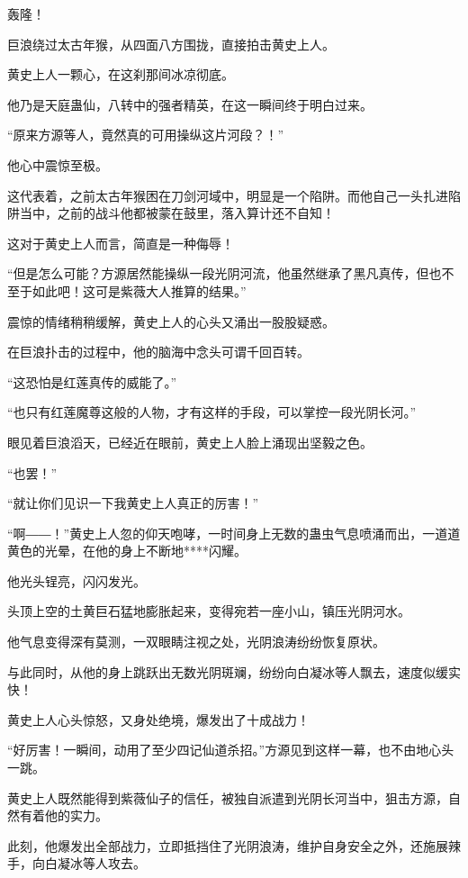 
\begin{this_body}

轰隆！

巨浪绕过太古年猴，从四面八方围拢，直接拍击黄史上人。

黄史上人一颗心，在这刹那间冰凉彻底。

他乃是天庭蛊仙，八转中的强者精英，在这一瞬间终于明白过来。

“原来方源等人，竟然真的可用操纵这片河段？！”

他心中震惊至极。

这代表着，之前太古年猴困在刀剑河域中，明显是一个陷阱。而他自己一头扎进陷阱当中，之前的战斗他都被蒙在鼓里，落入算计还不自知！

这对于黄史上人而言，简直是一种侮辱！

“但是怎么可能？方源居然能操纵一段光阴河流，他虽然继承了黑凡真传，但也不至于如此吧！这可是紫薇大人推算的结果。”

震惊的情绪稍稍缓解，黄史上人的心头又涌出一股股疑惑。

在巨浪扑击的过程中，他的脑海中念头可谓千回百转。

“这恐怕是红莲真传的威能了。”

“也只有红莲魔尊这般的人物，才有这样的手段，可以掌控一段光阴长河。”

眼见着巨浪滔天，已经近在眼前，黄史上人脸上涌现出坚毅之色。

“也罢！”

“就让你们见识一下我黄史上人真正的厉害！”

“啊――！”黄史上人忽的仰天咆哮，一时间身上无数的蛊虫气息喷涌而出，一道道黄色的光晕，在他的身上不断地****闪耀。

他光头锃亮，闪闪发光。

头顶上空的土黄巨石猛地膨胀起来，变得宛若一座小山，镇压光阴河水。

他气息变得深有莫测，一双眼睛注视之处，光阴浪涛纷纷恢复原状。

与此同时，从他的身上跳跃出无数光阴斑斓，纷纷向白凝冰等人飘去，速度似缓实快！

黄史上人心头惊怒，又身处绝境，爆发出了十成战力！

“好厉害！一瞬间，动用了至少四记仙道杀招。”方源见到这样一幕，也不由地心头一跳。

黄史上人既然能得到紫薇仙子的信任，被独自派遣到光阴长河当中，狙击方源，自然有着他的实力。

此刻，他爆发出全部战力，立即抵挡住了光阴浪涛，维护自身安全之外，还施展辣手，向白凝冰等人攻去。


\end{this_body}
